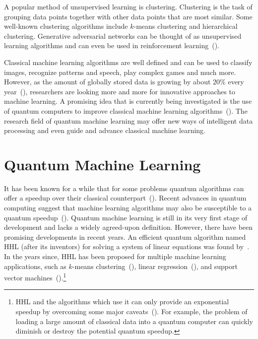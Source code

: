 \documentclass[a4paper,10pt]{article}
\begin{document}
A popular method of unsupervised learning is clustering.
Clustering is the task of grouping data points together with other data points that are most similar.
Some well-known clustering algorithms include $k$-means clustering and hierarchical clustering.
Generative adversarial networks can be thought of as unsupervised learning algorithms and can even be used in reinforcement learning~(\cite{ho2016generative}).

Classical machine learning algorithms are well defined and can be used to classify images, recognize patterns and speech, play complex games and much more.
However, as the amount of globally stored data is growing by about 20\% every year~(\cite{hilbert2011world}), researchers are looking more and more for innovative approaches to machine learning.
A promising idea that is currently being investigated is the use of quantum computers to improve classical machine learning algorithms~(\cite{schuld2015introduction}).
The research field of quantum machine learning may offer new ways of intelligent data processing and even guide and advance classical machine learning.

\section{Quantum Machine Learning} \label{sec:quantum-ml}
It has been known for a while that for some problems quantum algorithms can offer a speedup over their classical counterpart~(\cite{nielsen-chuang}).
Recent advances in quantum computing suggest that machine learning algorithms may also be susceptible to a quantum speedup~(\cite{lee2019experimental, lloyd2013quantum, gao2018quantum, yoo2014quantum, biamonte2017quantum}).
Quantum machine learning is still in its very first stage of development and lacks a widely agreed-upon definition.
However, there have been promising developments in recent years.
An efficient quantum algorithm named HHL (after its inventors) for solving a system of linear equations was found by~\textcite{harrow2009quantum}.
In the years since, HHL has been proposed for multiple machine learning applications, such as $k$-means clustering~(\cite{lloyd2013quantum}), linear regression~(\cite{schuld2016prediction, yu2017improved, wang2017quantum}), and support vector machines~(\cite{rebentrost2014quantum}).\footnote{HHL and the algorithms which use it can only provide an exponential speedup by overcoming some major caveats~(\cite{aaronson2015read}). For example, the problem of loading a large amount of classical data into a quantum computer can quickly diminish or destroy the potential quantum speedup.}
\end{document}
